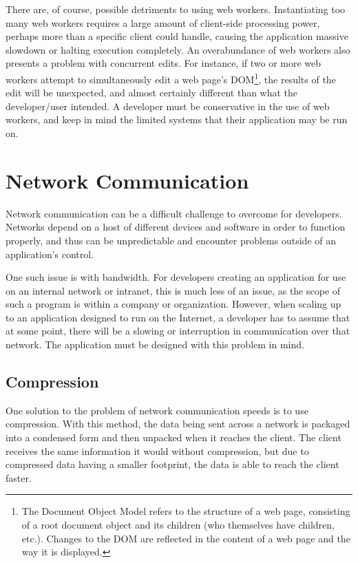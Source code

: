 \documentclass{acmsmall}
\begin{document}
There are, of course, possible detriments to using web workers.  Instantiating too many web workers requires a large amount of client-side processing power, perhaps more than a specific client could handle, causing the application massive slowdown or halting execution completely.  An overabundance of web workers also presents a problem with concurrent edits.  For instance, if two or more web workers attempt to simultaneously edit a web page's DOM\footnote{The Document Object Model refers to the structure of a web page, consisting of a root document object and its children (who themselves have children, etc.).  Changes to the DOM are reflected in the content of a web page and the way it is displayed.}, the results of the edit will be unexpected, and almost certainly different than what the developer/user intended.  A developer must be conservative in the use of web workers, and keep in mind the limited systems that their application may be run on.

\section{Network Communication}

Network communication can be a difficult challenge to overcome for developers.  Networks depend on a host of different devices and software in order to function properly, and thus can be unpredictable and encounter problems outside of an application's control.

One such issue is with bandwidth.  For developers creating an application for use on an internal network or intranet, this is much less of an issue, as the scope of such a program is within a company or organization.  However, when scaling up to an application designed to run on the Internet, a developer has to assume that at some point, there will be a slowing or interruption in communication over that network.  The application must be designed with this problem in mind.

\subsection{Compression}

One solution to the problem of network communication speeds is to use compression.  With this method, the data being sent across a network is packaged into a condensed form and then unpacked when it reaches the client.  The client receives the same information it would without compression, but due to compressed data having a smaller footprint, the data is able to reach the client faster.
\end{document}
